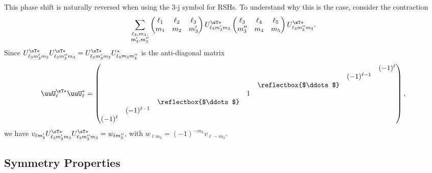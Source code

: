 This phase shift is naturally reversed when using the 3-j symbol for RSHs.
To understand why this is the case, consider the contraction
\begin{equation}
    \sum\limits_{\substack{\ell_3,m_3,\\m_3',m_3''}}
    \begin{pmatrix}
        \ell_1 & \ell_2 & \ell_3 \\ m_1 & m_2 & m_3'
    \end{pmatrix}
    U^{\sT\ast}_{\ell_3 m_3'm_3}
    \begin{pmatrix}
        \ell_3 & \ell_4 & \ell_5 \\ m_3'' & m_4 & m_5
    \end{pmatrix}
    U^{\sT\ast}_{\ell_3 m''_3m_3}.
\end{equation}
Since $U^{\sT\ast}_{\ell_3 m_3'm_3}U^{\sT\ast}_{\ell_3 m''_3m_3} = U^{\sT\ast}_{\ell_3 m_3'm_3}U^{\ast}_{\ell_3 m_3m''_3}$ is the anti-diagonal matrix
\begin{equation}
    \uuU^{\sT\ast}_\ell \uuU^\ast_\ell =
    \begin{pmatrix}
        &&&&&& (-1)^\ell \\
        &&&&& (-1)^{\ell-1} & \\
        &&&& \reflectbox{$\ddots$} && \\
        &&& 1 &&& \\
        && \reflectbox{$\ddots$} &&&& \\
        & (-1)^{\ell-1} &&&&& \\
        (-1)^\ell &&&&&&
    \end{pmatrix},
\end{equation}
we have $v_{\ell m_3'} U^{\sT\ast}_{\ell_3 m_3'm_3}U^{\sT\ast}_{\ell_3 m''_3m_3} = w_{\ell m_3''}$, with $w_{\ell m_3} = (-1)^{-m_3} v_{\ell -m_3}$.

\subsection{Symmetry Properties}
\label{appdx:w3j_symmetries}

